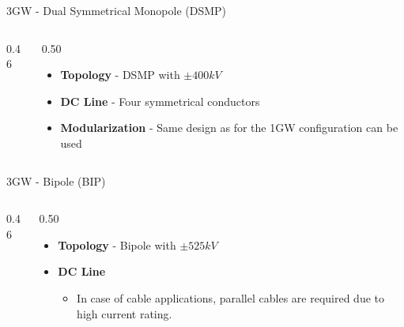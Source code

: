 \begin{frame}{3GW - Dual Symmetrical Monopole (DSMP)}
  \begin{columns}[c,onlytextwidth]
    \begin{column}{0.46\textwidth}
      \centering
    \end{column}
    \begin{column}{0.50\textwidth}
      \vspace{0.5em}
      \begin{itemize}
        \setlength{\itemsep}{0.7em}
        \item \textbf{Topology} - DSMP with $\pm400kV$
        \item \textbf{DC Line} - Four symmetrical conductors
        \item \textbf{Modularization} - Same design as for the 1GW configuration can be used
      \end{itemize}
    \end{column}
  \end{columns}
\end{frame}


\begin{frame}{3GW - Bipole (BIP)}
  \begin{columns}[c,onlytextwidth]
    \begin{column}{0.46\textwidth}
      \centering
    \end{column}
    \begin{column}{0.50\textwidth}
      \vspace{0.5em}
      \begin{itemize}
        \setlength{\itemsep}{0.7em}
        \item \textbf{Topology} - Bipole with $\pm525kV$
        \item \textbf{DC Line}
        \begin{itemize}
          \item In case of cable applications, parallel cables are required due to high current rating.
        \end{itemize}
      \end{itemize}
    \end{column}
  \end{columns}
\end{frame}


